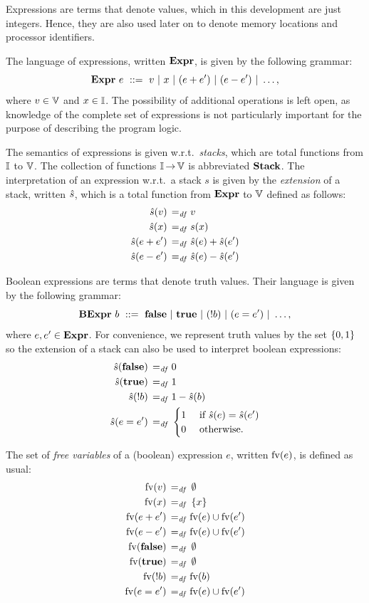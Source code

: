 \documentclass[11pt]{report}         %
\begin{document}
Expressions are terms that denote values, which in this development are just integers. Hence, they are also used later on to denote memory locations and processor identifiers. 

The language of expressions, written $\mathbf{Expr}$, is given by the following grammar: \[ \mathbf{Expr}~e ~::=~ v ~|~ x ~|~ (e + e') ~|~ (e - e') ~|~ \ldots, \] where $v \in \mathbb{V}$ and $x \in \mathbb{I}$. The possibility of additional operations is left open, as knowledge of the complete set of expressions is not particularly important for the purpose of describing the program logic.

The semantics of expressions is given w.r.t.\ \emph{stacks}, which are total functions from $\mathbb{I}$ to $\mathbb{V}$. The collection of functions $\mathbb{I} \operatorname{\rightarrow} \mathbb{V}$ is abbreviated $\mathbf{Stack}$. The interpretation of an expression w.r.t.\ a stack $s$ is given by the \emph{extension} of a stack, written $\hat{s}$, which is a total function from $\mathbf{Expr}$ to $\mathbb{V}$ defined as follows: \begin{align*}
    \hat{s}(v) \operatorname{\;=_{\mathit{df}}\;} & v \\
    \hat{s}(x) \operatorname{\;=_{\mathit{df}}\;} & s(x) \\
    \hat{s}(e + e') \operatorname{\;=_{\mathit{df}}\;} & \hat{s}(e) + \hat{s}(e') \\
    \hat{s}(e - e') \operatorname{\;=_{\mathit{df}}\;} & \hat{s}(e) - \hat{s}(e')
\end{align*}  

Boolean expressions are terms that denote truth values. Their language is given by the following grammar: \[ \mathbf{BExpr}~b ~::=~ \mathbf{false} ~|~ \mathbf{true} ~|~ (!b) ~|~ (e = e') ~|~ \ldots, \] where $e,e' \in \mathbf{Expr}$. For convenience, we represent truth values by the set $\left\lbrace 0,1 \right\rbrace$ so the extension of a stack can also be used to interpret boolean expressions: \begin{align*}
    \hat{s}(\mathbf{false}) \operatorname{\;=_{\mathit{df}}\;} & 0 \\
    \hat{s}(\mathbf{true}) \operatorname{\;=_{\mathit{df}}\;} & 1 \\
    \hat{s}(!b) \operatorname{\;=_{\mathit{df}}\;} & 1 - \hat{s}(b) \\
    \hat{s}(e = e') \operatorname{\;=_{\mathit{df}}\;} & \begin{cases}
        1 &\text{ if } \hat{s}(e) = \hat{s}(e')\\
        0 &\text{ otherwise.}
    \end{cases}
\end{align*}

The set of \emph{free variables} of a (boolean) expression $e$, written $\mathrm{fv}(e)$, is defined as usual: \begin{align*}
    \mathrm{fv}(v) \operatorname{\;=_{\mathit{df}}\;} & \operatorname{\emptyset} \\ 
    \mathrm{fv}(x) \operatorname{\;=_{\mathit{df}}\;} & \left\lbrace x \right\rbrace \\ 
    \mathrm{fv}(e + e') \operatorname{\;=_{\mathit{df}}\;} & \mathrm{fv}(e) \cup \mathrm{fv}(e') \\ 
    \mathrm{fv}(e - e') \operatorname{\;=_{\mathit{df}}\;} & \mathrm{fv}(e) \cup \mathrm{fv}(e') \\ 
    \mathrm{fv}(\mathbf{false}) \operatorname{\;=_{\mathit{df}}\;} & \operatorname{\emptyset} \\ 
    \mathrm{fv}(\mathbf{true}) \operatorname{\;=_{\mathit{df}}\;} & \operatorname{\emptyset} \\ 
    \mathrm{fv}(!b) \operatorname{\;=_{\mathit{df}}\;} & \mathrm{fv}(b) \\ 
    \mathrm{fv}(e = e') \operatorname{\;=_{\mathit{df}}\;} & \mathrm{fv}(e) \cup \mathrm{fv}(e')
\end{align*}
\end{document}
